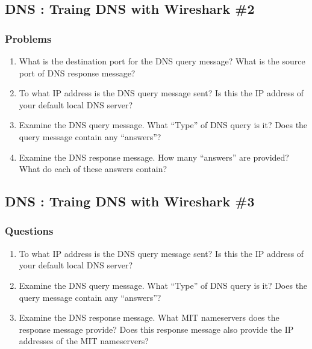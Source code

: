 \subsection{DNS : Traing DNS with Wireshark \#2}
    \subsubsection*{Problems}
    \begin{enumerate}[label=\bfseries Problem \arabic*:,leftmargin=*,labelindent=1em]\addtocounter{enumi}{7}
        \item What is the destination port for the DNS query message? 
        What is the source port of DNS response message?\\[0.2mm]
            \soln
            
        \item To what IP address is the DNS query message sent? 
        Is this the IP address of your default local DNS server?\\[0.2mm]
            \soln
            
        \item Examine the DNS query message. What “Type” of DNS query is it? 
        Does the query message contain any “answers”?\\[0.2mm]
            \soln
            
        \item Examine the DNS response message. 
        How many “answers” are provided? What do each of these answers contain?\\[0.2mm]
            \soln
            
    \end{enumerate}
\subsection{DNS : Traing DNS with Wireshark \#3}
    \subsubsection*{Questions}
    \begin{enumerate}[label=\bfseries Problem \arabic*:,leftmargin=*,labelindent=1em]\addtocounter{enumi}{11}
        \item To what IP address is the DNS query message sent? 
        Is this the IP address of your default local DNS server?\\[0.2mm]
            \soln
            
        \item Examine the DNS query message. What “Type” of DNS query is it? 
        Does the query message contain any “answers”?\\[0.2mm]
            \soln
            
        \item Examine the DNS response message. What MIT nameservers does the response message provide? 
        Does this response message also provide the IP addresses of the MIT nameservers?\\[0.2mm]
            \soln
            
    \end{enumerate}
